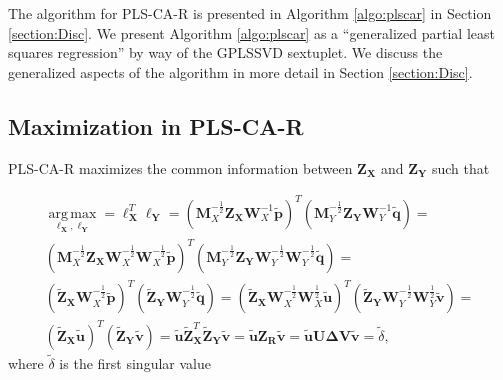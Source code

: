 \documentclass[12pt]{article}
\begin{document}
The algorithm for PLS-CA-R is presented in Algorithm \ref{algo:plscar}
in Section \ref{section:Disc}. We present Algorithm \ref{algo:plscar} as
a ``generalized partial least squares regression'' by way of the GPLSSVD
sextuplet. We discuss the generalized aspects of the algorithm in more
detail in Section \ref{section:Disc}.

\hypertarget{maximization-in-pls-ca-r}{%
\subsection{Maximization in PLS-CA-R}\label{maximization-in-pls-ca-r}}

PLS-CA-R maximizes the common information between
\({\mathbf Z}_{\mathbf X}\) and \({\mathbf Z}_{\mathbf Y}\) such that

\begin{equation}
\begin{aligned}
\underset{{\boldsymbol \ell}_{\mathbf X},{\boldsymbol \ell}_{\mathbf Y}}{\operatorname{arg\,max}} = {\boldsymbol \ell}_{\mathbf X}^{T}{\boldsymbol \ell}_{\mathbf Y} = 
({\mathbf M}_{X}^{-\frac{1}{2}}{\mathbf Z}_{\mathbf X}{\mathbf W}_{X}^{-1}\widetilde{\mathbf p})^{T}({\mathbf M}_{Y}^{-\frac{1}{2}}{\mathbf Z}_{\mathbf Y}{\mathbf W}_{Y}^{-1}\widetilde{\mathbf q}) = \\
({\mathbf M}_{X}^{-\frac{1}{2}}{\mathbf Z}_{\mathbf X}{\mathbf W}_{X}^{-\frac{1}{2}}{\mathbf W}_{X}^{-\frac{1}{2}}\widetilde{\mathbf p})^{T}({\mathbf M}_{Y}^{-\frac{1}{2}}{\mathbf Z}_{\mathbf Y}{\mathbf W}_{Y}^{-\frac{1}{2}}{\mathbf W}_{Y}^{-\frac{1}{2}}\widetilde{\mathbf q}) = \\
( \widetilde{\mathbf Z}_{\mathbf X} {\mathbf W}_{X}^{-\frac{1}{2}}\widetilde{\mathbf p})^{T}(\widetilde{\mathbf Z}_{\mathbf Y}{\mathbf W}_{Y}^{-\frac{1}{2}}\widetilde{\mathbf q}) = 
( \widetilde{\mathbf Z}_{\mathbf X} {\mathbf W}_{X}^{-\frac{1}{2}}{\mathbf W}_{X}^{\frac{1}{2}}\widetilde{\mathbf u})^{T}(\widetilde{\mathbf Z}_{\mathbf Y}{\mathbf W}_{Y}^{-\frac{1}{2}}{\mathbf W}_{Y}^{\frac{1}{2}}\widetilde{\mathbf v}) = \\ 
(\widetilde{\mathbf Z}_{\mathbf X}\widetilde{\mathbf u})^{T}(\widetilde{\mathbf Z}_{\mathbf Y}\widetilde{\mathbf v}) = \widetilde{\mathbf u}\widetilde{\mathbf Z}_{\mathbf X}^{T}\widetilde{\mathbf Z}_{\mathbf Y}\widetilde{\mathbf v} = \widetilde{\mathbf u}{\mathbf Z}_{\mathbf R}\widetilde{\mathbf v} = \widetilde{\mathbf u}{\mathbf U}{\boldsymbol \Delta}{\mathbf V}\widetilde{\mathbf v}  = \widetilde\delta,
\end{aligned}
\end{equation} where \(\widetilde\delta\) is the first singular value
\end{document}
